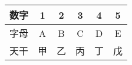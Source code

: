\documentclass [nofonts]{ctexart}
\begin{document}
\begin{center}
\tablefirsthead{\hline}
\tablelasttail{\hline}
\begin{xtabular}{|*{6}{c|}}
数字	& 1	& 2	& 3	& 4	& 5		\\
\hline
字母	& A	& B	& C	& D	& E		\\
\hline
天干	& 甲& 乙& 丙& 丁& 戊	\\
\end{xtabular}
\end{center}
\end{document}
